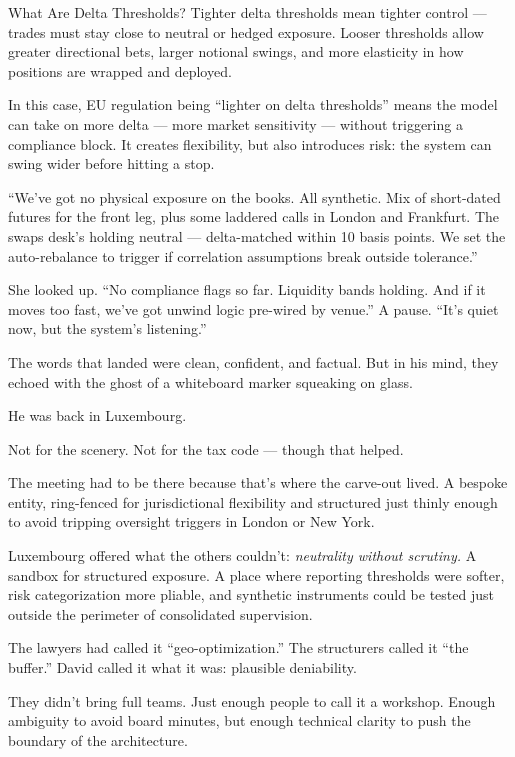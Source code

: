 \begin{TechnicalSidebar}{What Are Delta Thresholds?}
  Tighter delta thresholds mean tighter control — trades must stay close to neutral or hedged exposure.  
  Looser thresholds allow greater directional bets, larger notional swings, and more elasticity in how positions 
  are wrapped and deployed.

  \medskip

  In this case, EU regulation being “lighter on delta thresholds” means the model can take on more delta — more 
  market sensitivity —  
  without triggering a compliance block. It creates flexibility, but also introduces risk: the system can swing 
  wider before hitting a stop.

\end{TechnicalSidebar}

\medskip

``We’ve got no physical exposure on the books. All synthetic. Mix of short-dated futures for the front 
leg, plus some laddered calls in London and Frankfurt. The swaps desk’s holding neutral — delta-matched 
within 10 basis points. We set the auto-rebalance to trigger if correlation assumptions break outside 
tolerance.''

She looked up. ``No compliance flags so far. Liquidity bands holding. And if it moves too fast, we’ve 
got unwind logic pre-wired by venue.''
A pause. ``It’s quiet now, but the system’s listening.''

The words that landed were clean, confident, and factual.
But in his mind, they echoed with the ghost of a whiteboard marker squeaking on glass.

He was back in Luxembourg.

Not for the scenery. Not for the tax code — though that helped.

The meeting had to be there because that’s where the carve-out lived.
A bespoke entity, ring-fenced for jurisdictional flexibility and structured just thinly enough to avoid tripping oversight triggers in London or New York.

Luxembourg offered what the others couldn't:
\textit{neutrality without scrutiny.}
A sandbox for structured exposure.
A place where reporting thresholds were softer, risk categorization more pliable, and synthetic instruments could be tested just outside the perimeter of consolidated supervision.

The lawyers had called it “geo-optimization.”
The structurers called it “the buffer.”
David called it what it was: plausible deniability.

They didn’t bring full teams. Just enough people to call it a workshop.
Enough ambiguity to avoid board minutes, but enough technical clarity to push the boundary of the architecture.

